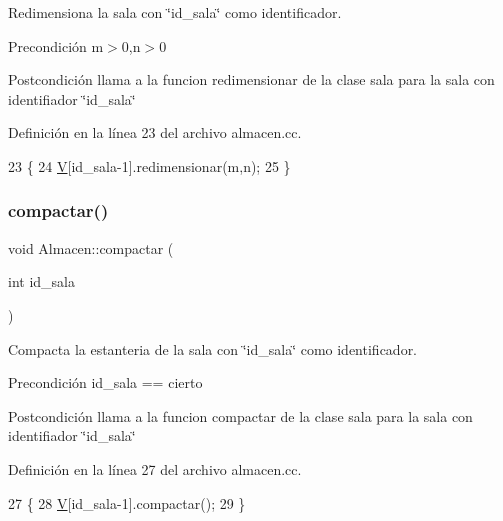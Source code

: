 Redimensiona la sala con \char`\"{}id\+\_\+sala\char`\"{} como identificador. 

\begin{DoxyPrecond}{Precondición}
m$>$0,n$>$0 
\end{DoxyPrecond}
\begin{DoxyPostcond}{Postcondición}
llama a la funcion redimensionar de la clase sala para la sala con identifiador \char`\"{}id\+\_\+sala\char`\"{} 
\end{DoxyPostcond}


Definición en la línea 23 del archivo almacen.\+cc.


\begin{DoxyCode}
23                                                     \{
24   \mbox{\hyperlink{class_almacen_a76cad3a8f2f670e26d7ceb827f7f9e69}{V}}[id\_sala-1].redimensionar(m,n);
25 \}
\end{DoxyCode}
\mbox{\label{class_almacen_a07e1c7a15df51e7361c81104044e83c6}} 
\subsubsection{\texorpdfstring{compactar()}{compactar()}}
{\footnotesize\ttfamily void Almacen\+::compactar (\begin{DoxyParamCaption}\item[{int}]{id\+\_\+sala }\end{DoxyParamCaption})}



Compacta la estanteria de la sala con \char`\"{}id\+\_\+sala\char`\"{} como identificador. 

\begin{DoxyPrecond}{Precondición}
id\+\_\+sala == cierto 
\end{DoxyPrecond}
\begin{DoxyPostcond}{Postcondición}
llama a la funcion compactar de la clase sala para la sala con identifiador \char`\"{}id\+\_\+sala\char`\"{} 
\end{DoxyPostcond}


Definición en la línea 27 del archivo almacen.\+cc.


\begin{DoxyCode}
27                                    \{
28   \mbox{\hyperlink{class_almacen_a76cad3a8f2f670e26d7ceb827f7f9e69}{V}}[id\_sala-1].compactar();
29 \}
\end{DoxyCode}
\mbox{\label{class_almacen_a0a1e01bf275ad983f13ff75ba9476455}} 
